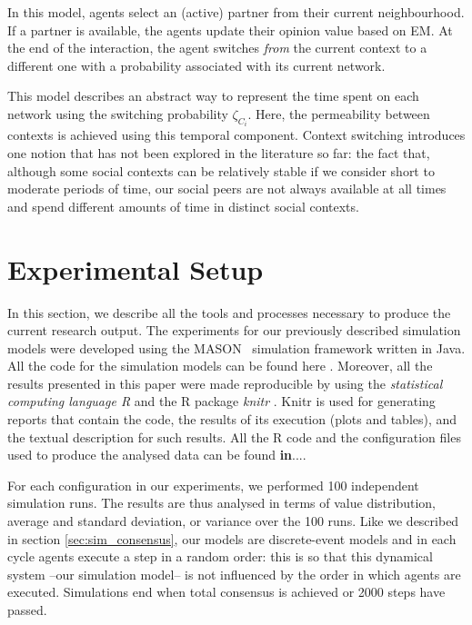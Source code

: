 \documentclass[preprint,number]{elsarticle}
\begin{document}
	\noindent In this model, agents select an (active) partner from their current neighbourhood. If a partner is available, the agents update their opinion value based on EM. At the end of the interaction, the agent switches \textit{from} the current context to a different one with a probability associated with its current network. 
	
	This model describes an abstract way to represent the time spent on each network using the switching probability $\zeta_{C_i}$. Here, the permeability between contexts is achieved using this temporal component. Context switching introduces one notion that has not been explored in the literature so far: the fact that, although some social contexts can be relatively stable if we consider short to moderate periods of time, our social peers are not always available at all times and spend different amounts of time in distinct social contexts.
	
	\section{Experimental Setup}
	\label{sec:experimental-setup}
	In this section, we describe all the tools and processes necessary to produce the current research output. The experiments for our previously described simulation models were developed using the MASON~\cite{Luke2005} simulation framework written in Java. All the code for the simulation models can be found here \cite{Nunes:Software:11067}. Moreover, all the results presented in this paper were made reproducible by using the \textit{statistical computing language R} \cite{R2008} and the R package \textit{knitr} \cite{knitr2014}. Knitr is used for generating reports that contain the code, the results of its execution (plots and tables), and the textual description for such results. All the R code and the configuration files used to produce the analysed data can be found \textbf{in}.... 

For each configuration in our experiments, we performed 100 independent simulation runs. The results are thus analysed in terms of value distribution, average and standard deviation, or variance over the 100 runs. Like we described in section \ref{sec:sim_consensus}, our models are discrete-event models and in each cycle agents execute 
a step in a random order: this is so that this dynamical system --our simulation model-- is not influenced by the order in which agents are executed. Simulations end when total consensus is achieved or 2000 steps have passed.  
\end{document}
